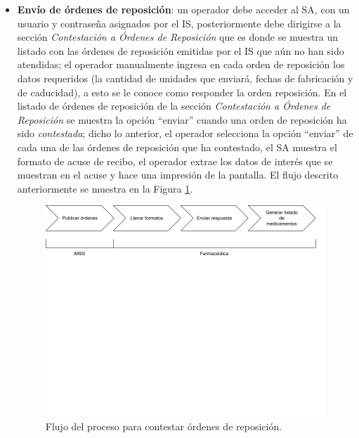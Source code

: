 \documentclass[letterpaper,11pt]{article}
\begin{document}
\begin{itemize}
\item \textbf{Envío de órdenes de reposición}: un operador debe acceder al SA, con un usuario y contraseña asignados por el IS, posteriormente debe dirigirse a la sección \textit{Contestación a Órdenes de Reposición} que es donde se muestra un listado con las órdenes de reposición emitidas por el IS que aún no han sido atendidas; el operador manualmente ingresa en cada orden de reposición los datos requeridos (la cantidad de unidades que enviará, fechas de fabricación y de caducidad), a esto se le conoce como responder la orden reposición. En el listado de órdenes de reposición de la sección \textit{Contestación a Órdenes de Reposición} se muestra la opción ``enviar'' cuando una orden de reposición ha sido \textit{contestada}; dicho lo anterior, el operador selecciona la opción ``enviar'' de cada una de las órdenes de reposición que ha contestado, el SA muestra el formato de acuse de recibo, el operador extrae los datos de interés que se muestran en el acuse y hace una impresión de la pantalla. El flujo descrito anteriormente se muestra en la Figura \ref{fig:flow-proc-contestar}.

\begin{figure}[h]
\centering
\includegraphics[scale=0.3]{flujo-proceso-contestar} 
\caption{Flujo del proceso para contestar órdenes de reposición.}
\label{fig:flow-proc-contestar}
\end{figure}


\end{itemize}
\end{document}
